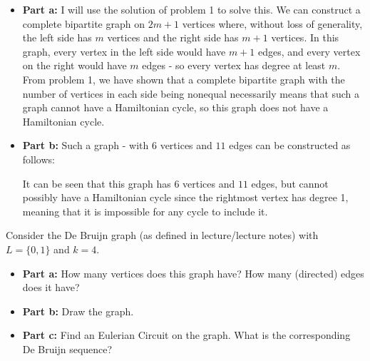 \documentclass{article}
\begin{document}
\begin{solution}
\begin{itemize}
	\item[]{\textbf{Part a:}} I will use the solution of problem 1 to solve this.  We can construct a complete bipartite graph on $2m+1$ vertices where, without loss of generality, the left side has $m$ vertices and the right side has $m+1$ vertices.  In this graph, every vertex in the left side would have $m+1$ edges, and every vertex on the right would have $m$ edges - so every vertex has degree at least $m$.  From problem 1, we have shown that a complete bipartite graph with the number of vertices in each side being nonequal necessarily means that such a graph cannot have a Hamiltonian cycle, so this graph does not have a Hamiltonian cycle.
	\item[]{\textbf{Part b:}} Such a graph - with $6$ vertices and $11$ edges can be constructed as follows:
	\newline\noindent
	It can be seen that this graph has $6$ vertices and $11$ edges, but cannot possibly have a Hamiltonian cycle since the rightmost vertex has degree 1, meaning that it is impossible for any cycle to include it.
\end{itemize}
\end{solution}


\begin{problem} Consider the De Bruijn graph (as defined in lecture/lecture notes) with $L = \{0,1\}$ and $k=4$.
\begin{itemize}
	\item[]{\textbf{Part a:}} How many vertices does this graph have? How many (directed) edges does it have?
	\item[]{\textbf{Part b:}} Draw the graph.
	\item[]{\textbf{Part c:}} Find an Eulerian Circuit on the graph. What is the corresponding De Bruijn sequence?
\end{itemize}
\end{problem}
\end{document}

